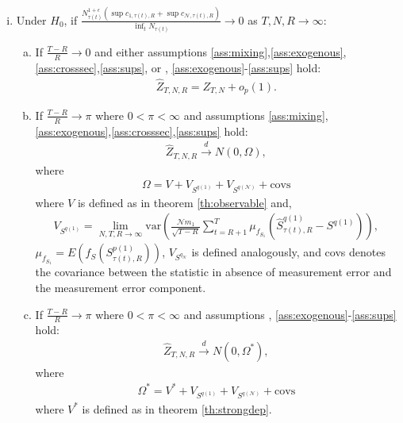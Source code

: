 \begin{corollary}
\label{cor:error} 

$\,$
\begin{enumerate}[(i)] 
\item Under $H_{0}$, if $\frac{N_{\tau(t)}^{1+\epsilon} \left( \sup c_{1,\tau(t),R} + \sup c_{\mathcal{N},\tau(t),R} \right)}{\inf_{t}N_{\tau(t)}} \rightarrow 0$ as $T,N,R\rightarrow \infty$:
\begin{enumerate}[(a)] 
\item \label{cor:error, i} If $\frac{T-R}{R} \rightarrow 0$ and either assumptions \ref{ass:mixing},\ref{ass:exogenous},\ref{ass:crosssec},\ref{ass:sups}, or , \ref{ass:exogenous}-\ref{ass:sups} hold:
\begin{align}
\widehat{Z}_{T,N,R}=Z_{T,N}+o_{p}(1).  \label{No-PEE}
\end{align}

\item If $\frac{T-R}{R} \rightarrow \pi $ where $0<\pi <\infty$ and assumptions \ref{ass:mixing},\ref{ass:exogenous},\ref{ass:crosssec},\ref{ass:sups} hold: 
\begin{align*}
	\widehat{Z}_{T,N,R}\overset{d}{\rightarrow }N\left( 0, \Omega \right),
\end{align*}
where
\begin{align*}
	\Omega = V+V_{S^{q(1)}}+V_{S^{q(\mathcal{N})}}+\text{covs}
\end{align*}
where $V$ is defined as in theorem \ref{th:observable} and, 
\begin{align*}
	V_{S^{q(1)}} = \lim_{N,T,R\rightarrow \infty }\mathrm{var}\left( \frac{\mathcal{N} m_{1}}{\sqrt{T-R}}\sum_{t=R+1}^{T} \mu_{f_{S_1}} \left(\widehat{S}_{\tau(t),R}^{q(1)}-S^{q(1)}\right) \right),
\end{align*}
$\mu_{f_{S_1}} = E \left( f_S \left( S_{\tau(t),R}^{p(1)} \right) \right)$, $V_{S^{q_{\mathcal{N}}}}$ is defined analogously, and \textrm{covs} denotes the covariance between the statistic in absence of measurement error and the measurement error component.

\item If $\frac{T-R}{R} \rightarrow \pi $ where $0<\pi <\infty$ and assumptions , \ref{ass:exogenous}-\ref{ass:sups} hold: 
\begin{align*}
	\widehat{Z}_{T,N,R}\overset{d}{\rightarrow }N\left( 0, \Omega^\ast \right),
\end{align*}
where
\begin{align*}
	\Omega^\ast = V^\ast + V_{S^{q(1)}}+V_{S^{q(\mathcal{N})}}+\text{covs}
\end{align*}
where $V^\ast$ is defined as in theorem \ref{th:strongdep}.
\end{enumerate}


\end{enumerate}
\end{corollary}

